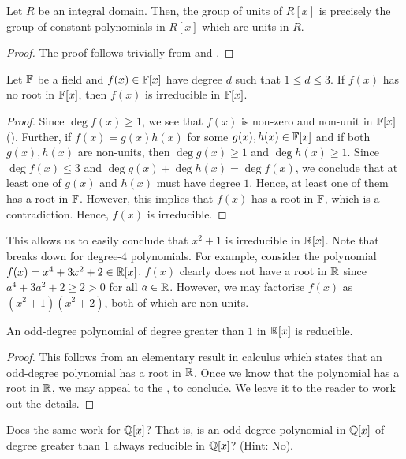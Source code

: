 \begin{cor} \label{cor:units-in-integral-domain-polynomials}
    Let $R$ be an integral domain. Then, the group of units of $R[x]$ is precisely the group of constant polynomials in $R[x]$ which are units in $R$.
\end{cor}
\begin{proof}
    The proof follows trivially from  and .
\end{proof}

\begin{prop} \label{prop:irreducible-cubic-in-field}
    Let $\mathbb{F}$ be a field and $f(x) \in \mathbb{F}[x]$ have degree $d$ such that $1 \leq d \leq 3$. If $f(x)$ has no root in $\mathbb{F}[x]$, then $f(x)$ is irreducible in $\mathbb{F}[x]$.
\end{prop}
\begin{proof}
    Since $\deg f(x) \geq 1$, we see that $f(x)$ is non-zero and non-unit in $\mathbb{F}[x]$ (). Further, if $f(x) = g(x)h(x)$ for some $g(x),h(x) \in \mathbb{F}[x]$ and if both $g(x),h(x)$ are non-units, then $\deg g(x) \geq 1$ and $\deg h(x) \geq 1$. Since $\deg f(x) \leq 3$ and $\deg g(x) + \deg h(x) = \deg f(x)$, we conclude that at least one of $g(x)$ and $h(x)$ must have degree $1$. Hence, at least one of them has a root in $\mathbb{F}$. However, this implies that $f(x)$ has a root in $\mathbb{F}$, which is a contradiction. Hence, $f(x)$ is irreducible.
\end{proof}
This allows us to easily conclude that $x^2 + 1$ is irreducible in $\mathbb{R}[x]$. Note that  breaks down for degree-$4$ polynomials. For example, consider the polynomial $f(x) = x^4 + 3x^2 + 2 \in \mathbb{R}[x]$. $f(x)$ clearly does not have a root in $\mathbb{R}$ since $a^4 + 3a^2 + 2 \geq 2 > 0$ for all $a \in \mathbb{R}$. However, we may factorise $f(x)$ as $(x^2+1)(x^2+2)$, both of which are non-units. 

\begin{prop}
    An odd-degree polynomial of degree greater than $1$ in $\mathbb{R}[x]$ is reducible.
\end{prop}
\begin{proof}
    This follows from an elementary result in calculus which states that an odd-degree polynomial has a root in $\mathbb{R}$. Once we know that the polynomial has a root in $\mathbb{R}$, we may appeal to the , to conclude. We leave it to the reader to work out the details.
\end{proof}
Does the same work for $\mathbb{Q}[x]$? That is, is an odd-degree polynomial in $\mathbb{Q}[x]$ of degree greater than $1$ always reducible in $\mathbb{Q}[x]$? (Hint: No).

